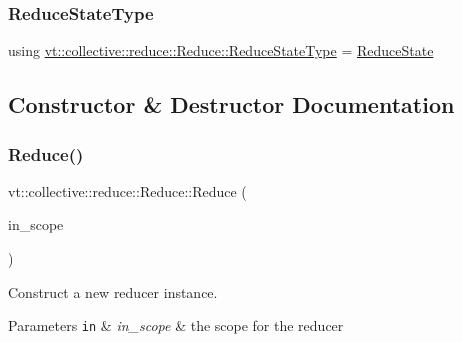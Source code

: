 \subsubsection{\texorpdfstring{Reduce\+State\+Type}{ReduceStateType}}
{\footnotesize\ttfamily using \hyperlink{structvt_1_1collective_1_1reduce_1_1_reduce_ab0e89b962f0741718107772505fe6d34}{vt\+::collective\+::reduce\+::\+Reduce\+::\+Reduce\+State\+Type} =  \hyperlink{structvt_1_1collective_1_1reduce_1_1_reduce_state}{Reduce\+State}}



\subsection{Constructor \& Destructor Documentation}
\mbox{\label{structvt_1_1collective_1_1reduce_1_1_reduce_a5e5a3c0e00259bec5aad517aeaba36ac}} 
\subsubsection{\texorpdfstring{Reduce()}{Reduce()}\hspace{0.1cm}{\footnotesize\ttfamily [1/2]}}
{\footnotesize\ttfamily vt\+::collective\+::reduce\+::\+Reduce\+::\+Reduce (\begin{DoxyParamCaption}\item[{\hyperlink{structvt_1_1collective_1_1reduce_1_1detail_1_1_reduce_scope}{detail\+::\+Reduce\+Scope} const \&}]{in\+\_\+scope }\end{DoxyParamCaption})\hspace{0.3cm}{\ttfamily [explicit]}}



Construct a new reducer instance. 


\begin{DoxyParams}[1]{Parameters}
\mbox{\tt in}  & {\em in\+\_\+scope} & the scope for the reducer \\
\hline
\end{DoxyParams}
\mbox{\label{structvt_1_1collective_1_1reduce_1_1_reduce_a346fd6b262828a501c342330fc091fec}} 
